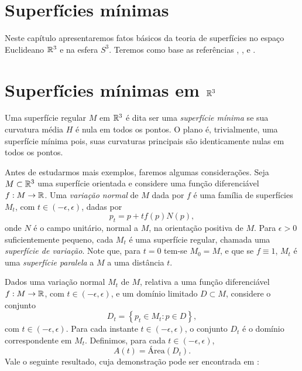 
\section{Superfícies mínimas}

Neste capítulo apresentaremos fatos básicos da teoria de superfícies no espaço Euclideano $\mathbb R^3$ e na esfera $S^3$. Teremos como base as referências \cite{Carmo1987}, \cite{Meeks2012}, \cite{Nitsche2011} e \cite{Brendle2013}.

\section{Superfícies mínimas em $\mathbb{R}^3$}

Uma superfície regular $M$ em $\mathbb R^3$ é dita ser uma \emph{superfície mínima} se sua curvatura média $H$ é nula em todos os pontos. O plano é, trivialmente, uma superfície mínima pois, suas curvaturas principais são identicamente nulas em todos os pontos.

Antes de estudarmos mais exemplos, faremos algumas considerações. Seja $M \subset \mathbb R^3$ uma superfície orientada e considere uma função diferenciável $f: M \rightarrow \mathbb R$. Uma \emph{variação normal} de $M$ dada por $f$ é uma família de superfícies $M_t$, com $t \in (-\epsilon,\epsilon)$, dadas por
\begin{equation*}
	p_t = p + t f(p) N(p),
\end{equation*}
onde $N$ é o campo unitário, normal a $M$, na orientação positiva de $M$. Para $\epsilon > 0$ suficientemente pequeno, cada $M_t$ é uma superfície regular, chamada uma \emph{superfície de variação}. Note que, para $t=0$ tem-se $M_0 = M$, e que se $f \equiv 1$, $M_t$ é uma \emph{superfície paralela} a $M$ a uma distância $t$.

Dados uma variação normal $M_t$ de $M$, relativa a uma função diferenciável $f: M \rightarrow \mathbb R$, com $t \in (-\epsilon,\epsilon)$, e um domínio limitado $D \subset M$, considere o conjunto
\begin{equation*}
	D_t = \left\{ p_t \in M_t: p \in D \right\},
\end{equation*}
com $t \in (-\epsilon,\epsilon)$. Para cada instante $t \in (-\epsilon,\epsilon)$, o conjunto $D_t$ é o domínio correspondente em $M_t$. Definimos, para cada $t \in (-\epsilon,\epsilon)$,
\begin{equation*}
	A(t) = \text{Área} (D_t).
\end{equation*}
Vale o seguinte resultado, cuja demonstração pode ser encontrada em \cite{Nitsche2011}:


